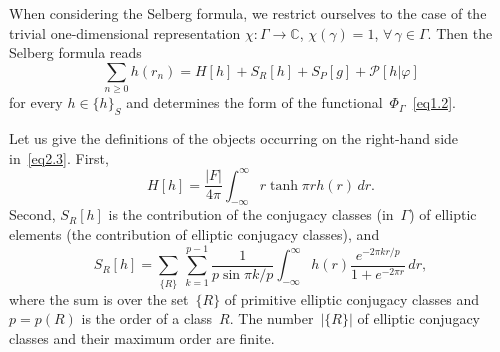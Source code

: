 \documentclass{amsart}
\theoremstyle{plain}
\theoremstyle{definition}
\numberwithin{equation}{section}
\begin{document}
When considering the Selberg formula, we restrict ourselves to the
case of the trivial one-dimensional representation
$\chi\colon\Gamma\to\mathbb{C}$, $\chi(\gamma)=1$,
$\forall\,\gamma\in\Gamma$. Then the Selberg formula reads
\begin{equation}
\label{eq2.3}
\sum_{n\geqslant0}h(r_n)=H[h]+S_R[h]+S_P[g]+\mathscr{P}[h|\varphi]
\end{equation}
for every $h\in\{h\}_S$ and determines the form of the
functional~$\Phi_\Gamma$~\eqref{eq1.2}.

Let us give the definitions of the objects occurring on the
right-hand side in~\eqref{eq2.3}. First,
\begin{equation}
\label{eq2.4}
H[h]=\frac{|F|}{4\pi}\int_{-\infty}^\infty r\tanh\pi rh(r)\,dr.
\end{equation}
Second, $S_R[h]$ is the contribution of the conjugacy classes
(in~$\Gamma$) of elliptic elements (the contribution of elliptic
conjugacy classes), and
\begin{equation}
\label{eq2.5}
S_R[h]=\sum_{\{R\}}\,\sum_{k=1}^{p-1}\frac{1}{p\sin\pi k/p}
\int_{-\infty}^\infty h(r)\frac{e^{-2\pi kr/p}}{1+e^{-2\pi r}}\,dr,
\end{equation}
where the sum is over the set~$\{R\}$ of primitive elliptic
conjugacy classes and $p=p(R)$ is the order of a class~$R$. The
number~$|\{R\}|$ of elliptic conjugacy classes and their maximum
order are finite.
\end{document}
